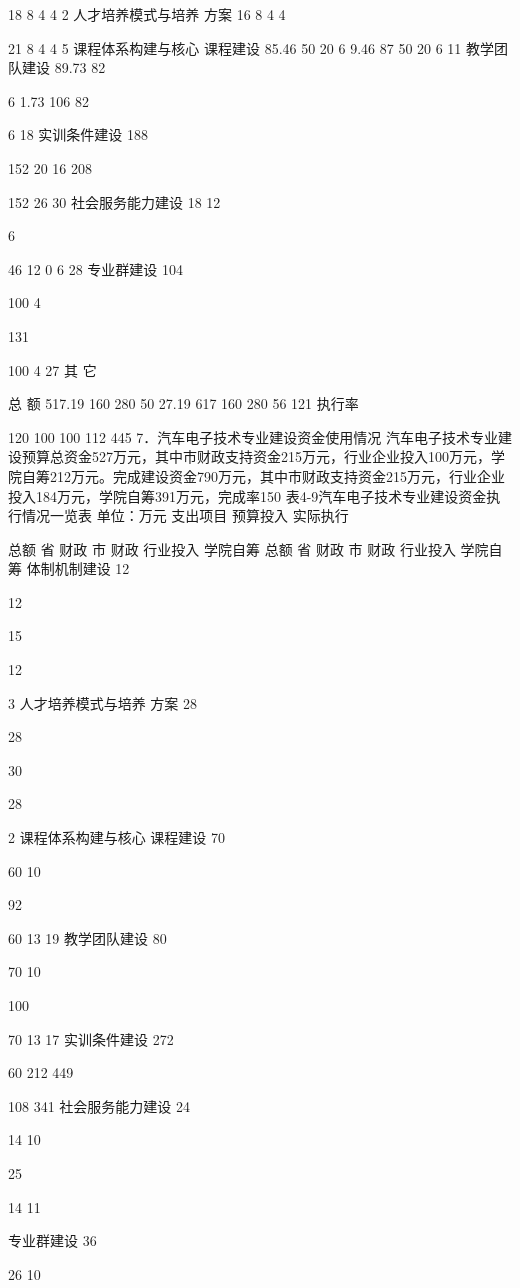 18
8
4
4
2
人才培养模式与培养
方案
16
8
4
4

21
8
4
4
5
课程体系构建与核心
课程建设
85.46
50
20
6
9.46
87
50
20
6
11
教学团队建设
89.73
82

6
1.73
106
82

6
18
实训条件建设
188

152
20
16
208

152
26
30
社会服务能力建设
18
12

6

46
12
0
6
28
专业群建设
104

100
4

131

100
4
27
其 它










总    额
517.19
160
280
50
27.19
617
160
280
56
121
执行率%

120
100
100
112
445
7．汽车电子技术专业建设资金使用情况
汽车电子技术专业建设预算总资金527万元，其中市财政支持资金215万元，行业企业投入100万元，学院自筹212万元。完成建设资金790万元，其中市财政支持资金215万元，行业企业投入184万元，学院自筹391万元，完成率150%
表4-9汽车电子技术专业建设资金执行情况一览表
单位：万元
支出项目
预算投入
实际执行

总额
省
财政
市
财政
行业投入
学院自筹
总额
省
财政
市
财政
行业投入
学院自筹
体制机制建设
12

12


15

12

3
人才培养模式与培养
方案
28

28


30

28

2
课程体系构建与核心
课程建设
70

60
10

92

60
13
19
教学团队建设
80

70
10

100

70
13
17
实训条件建设
272


60
212
449


108
341
社会服务能力建设
24

14
10

25

14
11

专业群建设
36

26
10

